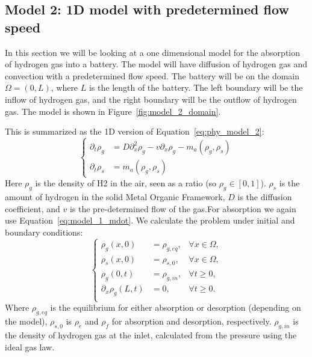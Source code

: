 \subsection{Model 2: 1D model with predetermined flow speed}\label{subseq:model_2}
In this section we will be looking at a one dimensional model for the absorption of hydrogen gas into a battery. The model will have diffusion of hydrogen gas and convection with a predetermined flow speed. The battery will be on the domain $\Omega = (0,L)$, where $L$ is the length of the battery. The left boundary will be the inflow of hydrogen gas, and the right boundary will be the outflow of hydrogen gas. The model is shown in Figure~\ref{fig:model_2_domain}.

This is summarized as the 1D version of Equation~\ref{eq:phy_model_2}:
\begin{equation}
    \left\{
    \begin{aligned}
        \partial_t\rho_g&=D\partial_x^2\rho_g-v\partial_x\rho_g-{m}_a(\rho_g, \rho_s)\\
        \partial_t\rho_s&={m}_a(\rho_g, \rho_s)
    \end{aligned}
    \right.
\end{equation}
Here $\rho_g$ is the density of H2 in the air, seen as a ratio (so $\rho_g\in[0,1]$). $\rho_s$ is the amount of hydrogen in the solid Metal Organic Framework, $D$ is the diffusion coefficient, and $v$ is the pre-determined flow of the gas.For absorption we again use Equation~\ref{eq:model_1_mdot}. We calculate the problem under initial and boundary conditions:
\begin{equation}
\left\{ \begin{aligned}
    \rho_g(x, 0)  &= \rho_{g,eq}, &\forall x\in \Omega,\\
    \rho_s(x,0) &= \rho_{s,0}, &\forall x\in \Omega,\\
    \rho_g(0, t)  &= \rho_{g,in}, &\forall t\geq 0, \\
    \partial_x\rho_g(L, t)  &= 0, &\forall t\geq 0. \\
\end{aligned}\right.
\end{equation}
Where $\rho_{g,eq}$ is the equilibrium for either absorption or desorption (depending on the model), $\rho_{s,0}$ is $\rho_{e}$ and $\rho_f$ for absorption and desorption, respectively. $\rho_{g,in}$ is the density of hydrogen gas at the inlet, calculated from the pressure using the ideal gas law. 

